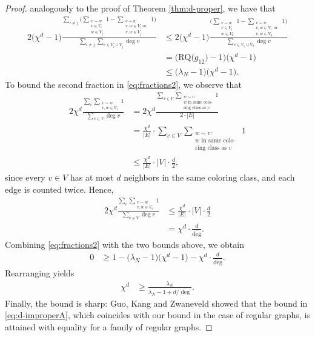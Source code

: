 \documentclass{article}
\newcommand{\RQ}{\textrm{RQ}}
\theoremstyle{plain}
\theoremstyle{definition}
\theoremstyle{remark}
\begin{document}
\begin{proof}
    analogously to the proof of Theorem \ref{thm:d-proper}, we have that
    \begin{align*}
        2\bigl(\chi^d-1\bigr)\frac{\sum_{i\neq j}\biggl(\sum_{\substack{v\sim w\\ v\in V_i\\ w\in V_j}}1 - \sum_{\substack{v\sim w\\ v,w\in V_i \text{ or }\\ v,w\in V_j}}1\biggr)}{\sum_{i\neq j}\sum_{v\in V_i\cup V_j}\deg v}
        &\leq 2\bigl(\chi^d-1\bigr)\frac{\biggl(\sum_{\substack{v\sim w\\ v\in V_1\\ w\in V_2}}1 - \sum_{\substack{v\sim w\\ v,w\in V_1 \text{ or }\\ v,w\in V_2}}1\biggr)}{\sum_{v\in V_1\cup V_2}\deg v} \\
        &= \bigl(\RQ\bigl(g_{12}\bigr)-1\bigr)\bigl(\chi^d-1\bigr)\\&\leq \bigl(\lambda_N-1\bigr)\bigl(\chi^d-1\bigr).
    \end{align*}
    To bound the second fraction in \eqref{eq:fractions2}, we observe that 
    \begin{align*}
        2\chi^d \frac{\sum_i\sum_{\substack{v\sim w\\v,w\in V_i}}1}{\sum_{v\in V}\deg v} &= 2\chi^d \frac{\sum_{v\in V} \sum_{\substack{w\sim v\colon\\ w\text{ in same colo-}\\\text{ring class as $v$}}}1}{2\cdot |E|}\\
        &= \frac{\chi^d}{|E|}\cdot \sum_{v\in V} \sum_{\substack{w\sim v\colon\\ w\text{ in same colo- }\\\text{ring class as $v$}}}1\\
        &\leq \frac{\chi^d}{|E|}\cdot |V| \cdot \frac d2,
    \end{align*}
    since every $v\in V$ has at most $d$ neighbors in the same coloring class, and each edge is counted twice. Hence,
    \begin{align*}
        2\chi^d \frac{\sum_i\sum_{\substack{v\sim w\\v,w\in V_i}}1}{\sum_{v\in V}\deg v}
        &\leq \frac{\chi^d}{|E|}\cdot |V| \cdot \frac d2\\
        &= \chi^d\cdot \frac{d}{\overline{\deg}}.
    \end{align*}
    Combining \eqref{eq:fractions2} with the two bounds above, we obtain
    \begin{align*}
        0 &\geq 1-\bigl(\lambda_N-1\bigr)\bigl(\chi^d-1\bigr) - \chi^d\cdot \frac{d}{\overline{\deg}}.
    \end{align*}
    Rearranging yields
    \begin{align*}
        \chi^d &\geq \frac{\lambda_N}{\lambda_N-1+d/\overline{\deg}}.
    \end{align*}
    Finally, the bound is sharp: Guo, Kang and Zwaneveld \cite{guo2024spectral} showed that the bound in \eqref{eq:d-improperA}, which coincides with our bound in the case of regular graphs, is attained with equality for a family of regular graphs.
\end{proof}
\end{document}

